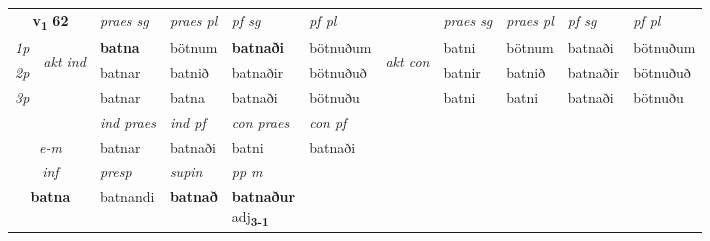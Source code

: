 \noindent
\begin{tabular}{lllllllllll} \toprule
\multicolumn{2}{c}{\textbf{v{\textsubscript{1}}} \Large{\textbf{62}}}  &  \textit{praes sg}  & \textit{praes pl}  &\textit{ pf sg} & \textit{pf pl} &  &  \textit{praes sg}  & \textit{praes pl}  & \textit{pf sg} & \textit{pf pl } \\*
	\cmidrule{3-6} \cmidrule{8-11}
 {\textit{1p}} & \multirow{3}{*}{\begin{turn}{90}\textit{akt ind}\end{turn}} & \textbf{batna} & bötnum & \textbf{batnaði} & bötnuðum & \multirow{3}{*}{\begin{turn}{90}\textit{akt con}\end{turn}} &batni & bötnum & batnaði & bötnuðum\\*
 {\textit{2p}} &  &  batnar  & batnið & batnaðir & bötnuðuð & & batnir & batnið & batnaðir & bötnuðuð \\*
{\textit{3p}} &  & batnar & batna & batnaði & bötnuðu & & batni & batni& batnaði & bötnuðu \\*
\cmidrule{3-6} \cmidrule{8-11}

   & &  \textit{ind praes} & \textit{ind pf} & \textit{con praes} & \textit{con pf} \\*
\multicolumn{2}{c}{ \textit{e-m} } & batnar & batnaði & batni & batnaði \\*

\cmidrule{3-5}
   \multicolumn{2}{c}{\textit{inf}}     & \textit{presp} & \textit{supin}  & \textit{pp m} \\*
  \multicolumn{2}{c}{\textbf{batna}}      & batnandi &  \textbf{batnað}  & \specialcell{\textbf{batnaður} \\ adj\textbf{\textsubscript{3-1}}} \\*
\end{tabular}

